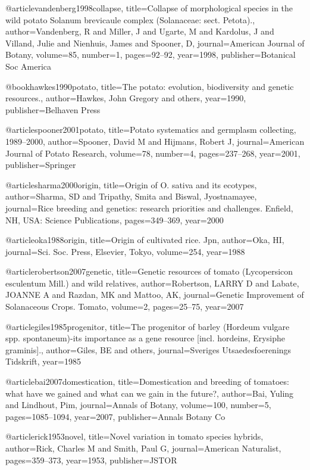 @article{vandenberg1998collapse,
  title={Collapse of morphological species in the wild potato Solanum brevicaule complex (Solanaceae: sect. Petota).},
  author={Vandenberg, R and Miller, J and Ugarte, M and Kardolus, J and Villand, Julie and Nienhuis, James and Spooner, D},
  journal={American Journal of Botany},
  volume={85},
  number={1},
  pages={92--92},
  year={1998},
  publisher={Botanical Soc America}
}

@book{hawkes1990potato,
  title={The potato: evolution, biodiversity and genetic resources.},
  author={Hawkes, John Gregory and others},
  year={1990},
  publisher={Belhaven Press}
}

@article{spooner2001potato,
  title={Potato systematics and germplasm collecting, 1989--2000},
  author={Spooner, David M and Hijmans, Robert J},
  journal={American Journal of Potato Research},
  volume={78},
  number={4},
  pages={237--268},
  year={2001},
  publisher={Springer}
}

@article{sharma2000origin,
  title={Origin of O. sativa and its ecotypes},
  author={Sharma, SD and Tripathy, Smita and Biswal, Jyostnamayee},
  journal={Rice breeding and genetics: research priorities and challenges. Enfield, NH, USA: Science Publications},
  pages={349--369},
  year={2000}
}

@article{oka1988origin,
  title={Origin of cultivated rice. Jpn},
  author={Oka, HI},
  journal={Sci. Soc. Press, Elsevier, Tokyo},
  volume={254},
  year={1988}
}

@article{robertson2007genetic,
  title={Genetic resources of tomato (Lycopersicon esculentum Mill.) and wild relatives},
  author={Robertson, LARRY D and Labate, JOANNE A and Razdan, MK and Mattoo, AK},
  journal={Genetic Improvement of Solanaceous Crops. Tomato},
  volume={2},
  pages={25--75},
  year={2007}
}

@article{giles1985progenitor,
  title={The progenitor of barley (Hordeum vulgare spp. spontaneum)-its importance as a gene resource [incl. hordeins, Erysiphe graminis].},
  author={Giles, BE and others},
  journal={Sveriges Utsaedesfoerenings Tidskrift},
  year={1985}
}

@article{bai2007domestication,
  title={Domestication and breeding of tomatoes: what have we gained and what can we gain in the future?},
  author={Bai, Yuling and Lindhout, Pim},
  journal={Annals of Botany},
  volume={100},
  number={5},
  pages={1085--1094},
  year={2007},
  publisher={Annals Botany Co}
}

@article{rick1953novel,
  title={Novel variation in tomato species hybrids},
  author={Rick, Charles M and Smith, Paul G},
  journal={American Naturalist},
  pages={359--373},
  year={1953},
  publisher={JSTOR}
}


